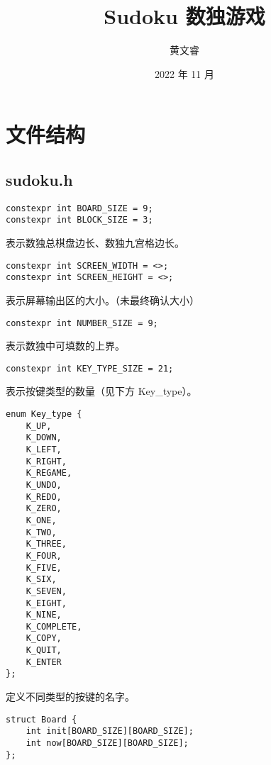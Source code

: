 \documentclass{article}
\title{Sudoku 数独游戏}
\author{黄文睿}
\date{2022 年 11 月}
\begin{document}
    \maketitle

    \tableofcontents

    
    \newpage

    \section{文件结构}
    \subsection{sudoku.h}

    \begin{lstlisting}
constexpr int BOARD_SIZE = 9;
constexpr int BLOCK_SIZE = 3;
    \end{lstlisting}

    表示数独总棋盘边长、数独九宫格边长。

    \begin{lstlisting}
constexpr int SCREEN_WIDTH = <>;
constexpr int SCREEN_HEIGHT = <>;
    \end{lstlisting}

    表示屏幕输出区的大小。（未最终确认大小）

    \begin{lstlisting}
constexpr int NUMBER_SIZE = 9;
    \end{lstlisting}

    表示数独中可填数的上界。

    \begin{lstlisting}
constexpr int KEY_TYPE_SIZE = 21;
    \end{lstlisting}

    表示按键类型的数量（见下方 Key\_type）。

    \begin{lstlisting}
enum Key_type {
    K_UP,
    K_DOWN,
    K_LEFT,
    K_RIGHT,
    K_REGAME,
    K_UNDO,
    K_REDO,
    K_ZERO,
    K_ONE,
    K_TWO,
    K_THREE,
    K_FOUR,
    K_FIVE,
    K_SIX,
    K_SEVEN,
    K_EIGHT,
    K_NINE,
    K_COMPLETE,
    K_COPY,
    K_QUIT,
    K_ENTER
};
    \end{lstlisting}

    定义不同类型的按键的名字。

    \begin{lstlisting}
struct Board {
    int init[BOARD_SIZE][BOARD_SIZE];
    int now[BOARD_SIZE][BOARD_SIZE];
};
    \end{lstlisting}
\end{document}
